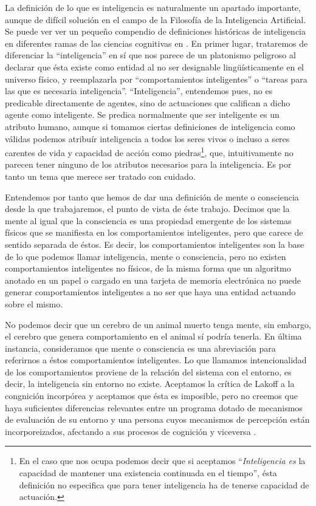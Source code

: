 \documentclass[12pt]{memoir}
\begin{document}
La definición de lo que es inteligencia es naturalmente un apartado importante, aunque de difícil solución en el campo de la Filosofía de la Inteligencia Artificial. Se puede ver ver un pequeño compendio de definiciones históricas de inteligencia en diferentes ramas de las ciencias cognitivas en \cite{intDefs}. En primer lugar, trataremos de diferenciar la ``inteligencia'' en sí que nos parece de un platonismo peligroso al declarar que ésta existe como entidad al no ser designable lingüísticamente en el universo físico, y reemplazarla por ``comportamientos inteligentes'' o ``tareas para las que es necesaria inteligencia''. ``Inteligencia'', entendemos pues, no es predicable directamente de agentes, sino de actuaciones que califican a dicho agente como inteligente. Se predica normalmente que ser inteligente es un atributo humano, aunque si tomamos ciertas definiciones de inteligencia como válidas podemos atribuír inteligencia a todos los seres vivos o incluso a seres carentes de vida y capacidad de acción como piedras\footnote{En el caso que nos ocupa podemos decir que si aceptamos ``\textit{Inteligencia es} la capacidad de mantener una existencia continuada en el tiempo'', ésta definición no especifica que para tener inteligencia ha de tenerse capacidad de actuación.}, que, intuitivamente no parecen tener ninguno de los atributos necesarios para la inteligencia. Es por tanto un tema que merece ser tratado con cuidado.

Entendemos por tanto que hemos de dar una definición de mente o consciencia desde la que trabajaremos, el punto de vista de éste trabajo. Decimos que la mente al igual que la consciencia es una propiedad emergente de los sistemas físicos que se manifiesta en los comportamientos inteligentes, pero que carece de sentido separada de éstos. Es decir, los comportamientos inteligentes son la base de lo que podemos llamar inteligencia, mente o consciencia, pero no existen comportamientos inteligentes no físicos, de la misma forma que un algoritmo anotado en un papel o cargado en una tarjeta de memoria electrónica no puede generar comportamientos inteligentes a no ser que haya una entidad actuando sobre el mismo. 

\nocite{newmind}

No podemos decir que un cerebro de un animal muerto tenga mente, sin embargo, el cerebro que genera comportamiento en el animal sí podría tenerla. En última instancia, consideramos que mente o consciencia es una abreviación para referirnos a éstos comportamientos inteligentes. Lo que llamamos intencionalidad de los comportamientos proviene de la relación del sistema con el entorno, es decir, la inteligencia sin entorno no existe. Aceptamos la crítica de Lakoff a la congnición incorpórea y aceptamos que ésta es imposible, pero no creemos que haya suficientes diferencias relevantes entre un programa dotado de mecanismos de evaluación de su entorno y una persona cuyos mecanismos de percepción están incorporeizados, afectando a sus procesos de cognición y viceversa \parencite{lakoff}. 
\end{document}
